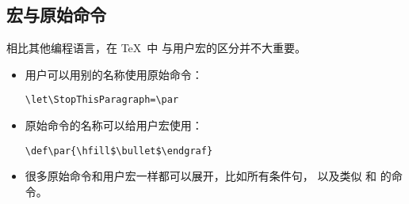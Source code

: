 \documentclass{book}
\begin{document}
\subsection{宏与原始命令}

%     
相比其他编程语言，在 \TeX\ 中%
与用户宏的区分并不大重要。 
\begin{itemize}
\item 用户可以用别的名称使用原始命令： 
\begin{verbatim}
\let\StopThisParagraph=\par
\end{verbatim}
\item 原始命令的名称可以给用户宏使用：
\begin{verbatim}
\def\par{\hfill$\bullet$\endgraf}
\end{verbatim}
\item 很多原始命令和用户宏一样都可以展开，比如所有条件句，
以及类似  和  的命令。
\end{itemize}

\end{document}

